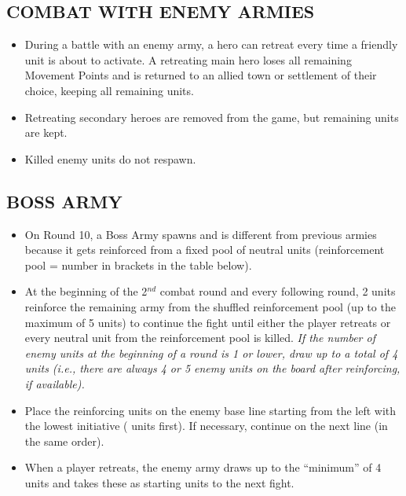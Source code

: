 \subsection*{\MakeUppercase{Combat with Enemy Armies}}

\begin{itemize}
  \item During a battle with an enemy army, a hero can retreat every time a friendly unit is about to activate.
    A retreating main hero loses all remaining Movement Points and is returned to an allied town or settlement of their choice, keeping all remaining units.
  \item Retreating secondary heroes are removed from the game, but remaining units are kept.
  \item Killed enemy units do not respawn.
\end{itemize}

\subsection*{\MakeUppercase{Boss Army}}

\begin{itemize}
  \item On Round 10, a Boss Army spawns and is different from previous armies because it gets reinforced from a fixed pool of neutral units (reinforcement pool = number in brackets in the table below).
  \item At the beginning of the 2$^{nd}$ combat round and every following round, 2 units reinforce the remaining army from the shuffled reinforcement pool (up to the maximum of 5 units) to continue the fight until either the player retreats or every neutral unit from the reinforcement pool is killed. \textit{If the number of enemy units at the beginning of a round is 1 or lower, draw up to a total of 4 units (i.e., there are always 4 or 5 enemy units on the board after reinforcing, if available).}
  \item Place the reinforcing units on the enemy base line starting from the left with the lowest initiative ( units first). If necessary, continue on the next line (in the same order).
  \item When a player retreats, the enemy army draws up to the ``minimum'' of 4 units and takes these as starting units to the next fight.
\end{itemize}

